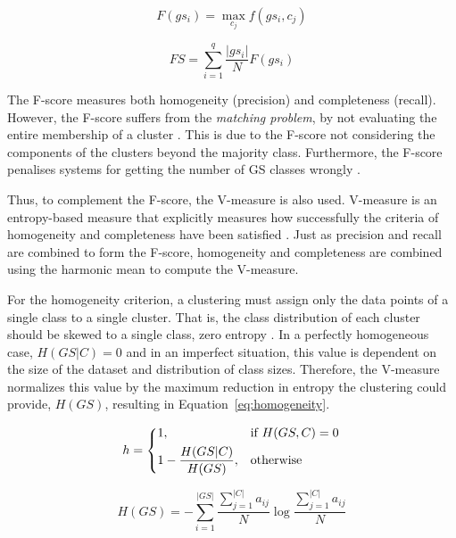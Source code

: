 \begin{equation} \label{eq:fscoregs}
 F(gs_i) = \underset{c_j}{\max} f(gs_i, c_j)
\end{equation}

\begin{equation} \label{eq:fscore}
 FS = \sum_{i=1}^q \frac{|gs_i|}{N}F(gs_i)
\end{equation}

The F-score measures both homogeneity (precision) and completeness (recall).
However, the F-score suffers from the \textit{matching problem}, by not
evaluating the entire membership of a cluster \citep{rosenberg2007v}. This is
due to the F-score not considering the components of the clusters beyond the
majority class. Furthermore, the F-score penalises systems for getting the
number of \ac{GS} classes wrongly \citep{manandhar2009semeval}.

Thus, to complement the F-score, the V-measure is also used. V-measure is an
entropy-based measure that explicitly measures how successfully the criteria
of homogeneity and completeness have been satisfied \citep{rosenberg2007v}. Just
as precision and recall are combined to form the F-score, homogeneity and
completeness are combined using the harmonic mean to compute the V-measure.

For the homogeneity criterion, a clustering must assign only the data points of a
single class to a single cluster. That is, the class distribution of each
cluster should be skewed to a single class, zero entropy \citep{rosenberg2007v}.
In a perfectly homogeneous case, $H(GS|C) = 0$ and in an imperfect situation,
this value is dependent on the size of the dataset and distribution of class
sizes. Therefore, the V-measure normalizes this value by the maximum reduction
in entropy the clustering could provide, $H(GS)$, resulting in
Equation~\ref{eq:homogeneity}.

\begin{equation} \label{eq:homogeneity}
 h = \begin{dcases}
      1,                        & \text{if } H(GS,C) = 0 \\
      1 - \frac{H(GS|C)}{H(GS)},& \text{otherwise} \\
     \end{dcases}
\end{equation}

\begin{equation}
 H(GS) = - \sum_{i=1}^{|GS|} \frac{\sum_{j=1}^{|C|} a_{ij}}{N}
         \log \frac{\sum_{j=1}^{|C|} a_{ij}}{N}
\end{equation}

